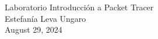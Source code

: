 \documentclass[]{article}
\title{}
\author{}
\begin{document}
\begin{center}
	Laboratorio Introducción a Packet Tracer \\
	Estefanía Leva Ungaro \\
	August 29, 2024
\end{center}
\maketitle

\begin{abstract}

\end{abstract}

\section{}
\end{document}
